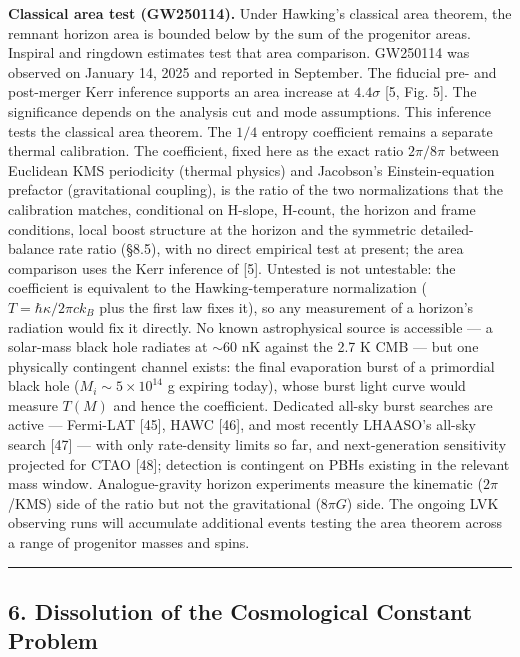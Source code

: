 \documentclass[
]{article}
\begin{document}
\textbf{Classical area test (GW250114).} Under Hawking's classical area
theorem, the remnant horizon area is bounded below by the sum of the
progenitor areas. Inspiral and ringdown estimates test that area
comparison. GW250114 was observed on January 14, 2025 and reported in
September. The fiducial pre- and post-merger Kerr inference supports an
area increase at \(4.4\sigma\) {[}5, Fig. 5{]}. The significance depends
on the analysis cut and mode assumptions. This inference tests the
classical area theorem. The \(1/4\) entropy coefficient remains a
separate thermal calibration. The coefficient, fixed here as the exact
ratio \(2\pi/8\pi\) between Euclidean KMS periodicity (thermal physics)
and Jacobson's Einstein-equation prefactor (gravitational coupling), is
the ratio of the two normalizations that the calibration matches,
conditional on H-slope, H-count, the horizon and frame conditions, local
boost structure at the horizon and the symmetric detailed-balance rate
ratio (§8.5), with no direct empirical test at present; the area
comparison uses the Kerr inference of {[}5{]}. Untested is not
untestable: the coefficient is equivalent to the Hawking-temperature
normalization (\(T = \hbar\kappa/2\pi c k_B\) plus the first law fixes
it), so any measurement of a horizon's radiation would fix it directly.
No known astrophysical source is accessible --- a solar-mass black hole
radiates at \(\sim 60\) nK against the 2.7 K CMB --- but one physically
contingent channel exists: the final evaporation burst of a primordial
black hole (\(M_i \sim 5 \times 10^{14}\) g expiring today), whose burst
light curve would measure \(T(M)\) and hence the coefficient. Dedicated
all-sky burst searches are active --- Fermi-LAT {[}45{]}, HAWC {[}46{]},
and most recently LHAASO's all-sky search {[}47{]} --- with only
rate-density limits so far, and next-generation sensitivity projected
for CTAO {[}48{]}; detection is contingent on PBHs existing in the
relevant mass window. Analogue-gravity horizon experiments measure the
kinematic (\(2\pi\)/KMS) side of the ratio but not the gravitational
(\(8\pi G\)) side. The ongoing LVK observing runs will accumulate
additional events testing the area theorem across a range of progenitor
masses and spins.

\begin{center}\rule{0.5\linewidth}{0.5pt}\end{center}

\hypertarget{dissolution-of-the-cosmological-constant-problem}{%
\subsection{6. Dissolution of the Cosmological Constant
Problem}\label{dissolution-of-the-cosmological-constant-problem}}
\end{document}
